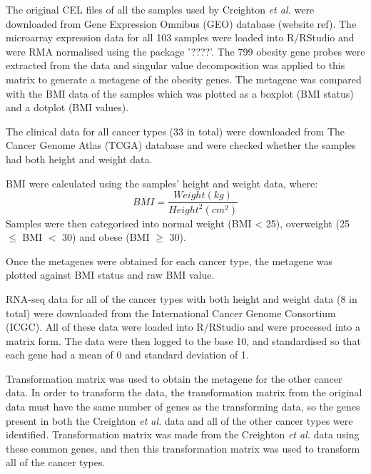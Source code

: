 \documentclass[12pt, a4paper]{article}
\begin{document}
\begin{description}[leftmargin=0pt]

\item[Validation of the methodology used.]

The original CEL files of all the samples used by Creighton \textit{et al.} were downloaded from Gene Expression Omnibus (GEO) database (website ref).
The microarray expression data for all 103 samples were loaded into R/RStudio and were RMA normalised using the package '????'.
The 799 obesity gene probes were extracted from the data and singular value decomposition was applied to this matrix to generate a metagene of the obesity genes.
The metagene was compared with the BMI data of the samples which was plotted as a boxplot (BMI status) and a dotplot (BMI values).

\item[Identification of samples with BMI data.]

The clinical data for all cancer types (33 in total) were downloaded from The Cancer Genome Atlas (TCGA) database and were checked whether the samples had both height and weight data.

\item[BMI calculation and categorisation.]

    BMI were calculated using the samples' height and weight data, where:
    \begin{equation*}
    BMI = \frac{Weight(kg)}{Height^2(cm^2)}
\end{equation*}
Samples were then categorised into normal weight (BMI \textless{ }25), overweight (25 $\le$ BMI $<$ 30) and obese (BMI $\ge$ 30).

\item[Assessing whether the metagene is associated with BMI.]

Once the metagenes were obtained for each cancer type, the metagene was plotted against BMI status and raw BMI value.

\item[Processing the cancer data.]

RNA-seq data for all of the cancer types with both height and weight data (8 in total) were downloaded from the International Cancer Genome Consortium (ICGC).
All of these data were loaded into R/RStudio and were processed into a matrix form.
The data were then logged to the base 10, and standardised so that each gene had a mean of 0 and standard deviation of 1.

\item[Transforming the cancer data.]

Transformation matrix was used to obtain the metagene for the other cancer data.
In order to transform the data, the transformation matrix from the original data must have the same number of genes as the transforming data, so the genes present in both the Creighton \textit{et al.} data and all of the other cancer types were identified.
Transformation matrix was made from the Creighton \textit{et al.} data using these common genes, and then this transformation matrix was used to transform all of the cancer types.

\end{description}
\end{document}
